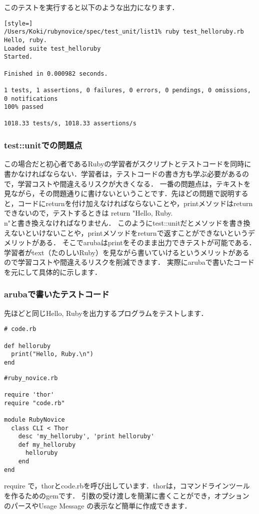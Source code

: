 このテストを実行すると以下のような出力になります．
\begin{lstlisting}[style=]
/Users/Koki/rubynovice/spec/test_unit/list1% ruby test_helloruby.rb 
Hello, ruby.
Loaded suite test_helloruby
Started.

Finished in 0.000982 seconds.

1 tests, 1 assertions, 0 failures, 0 errors, 0 pendings, 0 omissions, 0 notifications
100% passed

1018.33 tests/s, 1018.33 assertions/s
\end{lstlisting}
\subsubsection{test::unitでの問題点}
この場合だと初心者であるRubyの学習者がスクリプトとテストコードを同時に書かなければならない．学習者は，テストコードの書き方も学ぶ必要があるので，学習コストや間違えるリスクが大きくなる．
一番の問題点は，テキストを見ながら，その問題通りに書けないということです．先ほどの問題で説明すると，コードにreturnを付け加えなければならないことや，printメソッドはreturnできないので，テストするときは return "Hello, Ruby.\\n"と書き換えなければなりません．
このようにtest::unitだとメソッドを書き換えないといけないことや，printメソッドをreturnで返すことができないというデメリットがある．
そこでarubaはprintをそのまま出力できテストが可能である．学習者がtext（たのしいRuby）を見ながら書いていけるというメリットがあるので学習コストや間違えるリスクを削減できます．
実際にarubaで書いたコードを元にして具体的に示します．

\subsubsection{arubaで書いたテストコード}
先ほどと同じHello, Rubyを出力するプログラムをテストします．
\begin{lstlisting}[style=customRuby]
# code.rb

def helloruby    
  print("Hello, Ruby.\n")
end
\end{lstlisting}\begin{lstlisting}[style=customRuby]
#ruby_novice.rb

require 'thor'                                                                         
require "code.rb"

module RubyNovice
  class CLI < Thor
    desc 'my_helloruby', 'print helloruby'
    def my_helloruby
      helloruby
    end
end
\end{lstlisting}
require で，thorとcode.rbを呼び出しています．thorは，コマンドラインツールを作るためのgemです．
引数の受け渡しを簡潔に書くことができ，オプションのパースやUsage Message の表示など簡単に作成できます．

